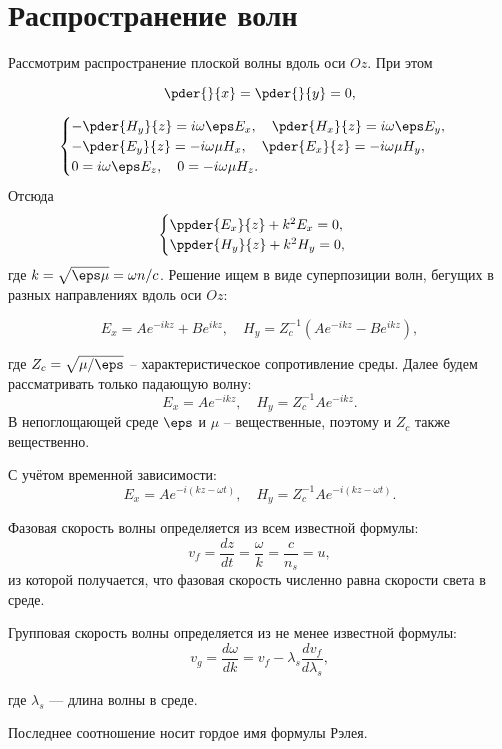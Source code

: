 \chapter{Распространение волн}
Рассмотрим распространение плоской волны вдоль оси \(Oz\). При этом

\[
    \pder{}{x} = \pder{}{y} = 0,
\]

\[
    \begin{cases}
        -\pder{H_y}{z} = i\omega\eps E_x,\quad \pder{H_x}{z} = i\omega\eps E_y,\\
        -\pder{E_y}{z} = -i\omega\mu H_x,\quad \pder{E_x}{z} = -i\omega\mu H_y,\\
        0 = i\omega\eps E_z,\quad 0 = -i\omega\mu H_z.
    \end{cases}
\]
Отсюда
\[
    \begin{cases}
        \ppder{E_x}{z} + k^2 E_x = 0,\\
        \ppder{H_y}{z} + k^2 H_y = 0,\\
    \end{cases}
\]
где \( k = \sqrt{\eps\mu} = \omega n / c \).
Решение ищем в виде суперпозиции волн, бегущих в разных направлениях вдоль оси
\( Oz \):

\[
    E_x = Ae^{-ikz} + Be^{ikz},\quad H_y = Z_c^{-1} (Ae^{-ikz} - Be^{ikz}),
\]

где \( Z_c = \sqrt{\mu / \eps} \) -- характеристическое сопротивление среды.
Далее будем рассматривать только падающую волну:
\[
    E_x = Ae^{-ikz},\quad H_y = Z_c^{-1} Ae^{-ikz}.
\]
В непоглощающей среде \(\eps\) и \(\mu\) -- вещественные, поэтому и \(Z_c\)
также вещественно.

С учётом временной зависимости:
\[
    E_x = Ae^{-i(kz-\omega t)},\quad H_y = Z_c^{-1} Ae^{-i(kz-\omega t)}.
\]

Фазовая скорость волны определяется из всем известной формулы:
\[
v_f=\frac{dz}{dt}=\frac{\omega}{k}=\frac{c}{n_s}=u,
\]
из которой получается, что фазовая скорость численно равна скорости света в среде.

Групповая скорость волны определяется из не менее известной формулы:
\[
v_g=\frac{d\omega}{dk}=v_f - \lambda_s\frac{dv_f}{d\lambda_s},
\]

где $\lambda_s$ --- длина волны в среде.


Последнее соотношение носит гордое имя формулы Рэлея.
